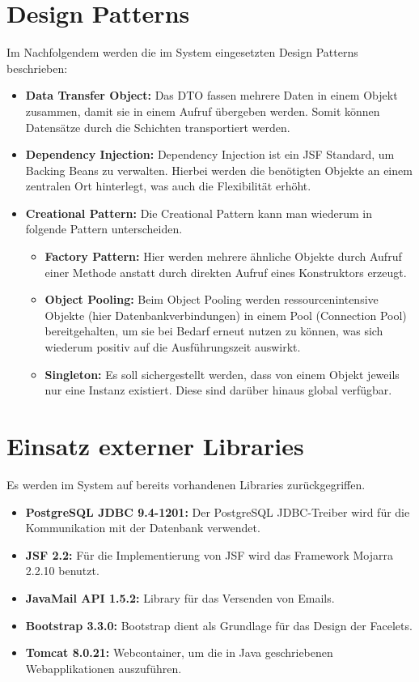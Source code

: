 \section{Design Patterns}
Im Nachfolgendem werden die im System eingesetzten Design Patterns beschrieben:
	\begin{itemize}
		\item \textbf{Data Transfer Object:} Das DTO fassen mehrere Daten in einem Objekt zusammen, damit sie in einem Aufruf übergeben werden. Somit können Datensätze durch die Schichten transportiert werden.
		\item \textbf{Dependency Injection:} Dependency Injection ist ein JSF Standard, um Backing Beans zu verwalten. Hierbei werden die benötigten Objekte an einem zentralen Ort hinterlegt, was auch die Flexibilität erhöht.  
		\item \textbf{Creational Pattern:} Die Creational Pattern kann man wiederum in folgende Pattern unterscheiden.
			\begin{itemize}
				\item \textbf{Factory Pattern:} Hier werden mehrere ähnliche Objekte durch Aufruf einer Methode anstatt durch direkten Aufruf eines Konstruktors erzeugt.
				\item \textbf{Object Pooling:} Beim Object Pooling werden ressourcenintensive Objekte (hier Datenbankverbindungen) in einem Pool (Connection Pool) bereitgehalten, um sie bei Bedarf erneut nutzen zu können, was sich wiederum positiv auf die Ausführungszeit auswirkt.
				\item \textbf{Singleton:} Es soll sichergestellt werden, dass von einem Objekt jeweils nur eine Instanz existiert. Diese sind darüber hinaus global verfügbar.  
			\end{itemize}
	\end{itemize}
\section{Einsatz externer Libraries}
Es werden im System auf bereits vorhandenen Libraries zurückgegriffen.
	\begin{itemize}
		\item \textbf{PostgreSQL JDBC 9.4-1201:} Der PostgreSQL JDBC-Treiber wird für die Kommunikation mit der Datenbank verwendet.
		\item \textbf{JSF 2.2:} Für die Implementierung von JSF wird das Framework Mojarra 2.2.10 benutzt.
		\item \textbf{JavaMail API 1.5.2:} Library für das Versenden von Emails.
		\item \textbf{Bootstrap 3.3.0:} Bootstrap dient als Grundlage für das Design der Facelets.
		\item \textbf{Tomcat 8.0.21:} Webcontainer, um die in Java geschriebenen Webapplikationen auszuführen.  
	\end{itemize}
